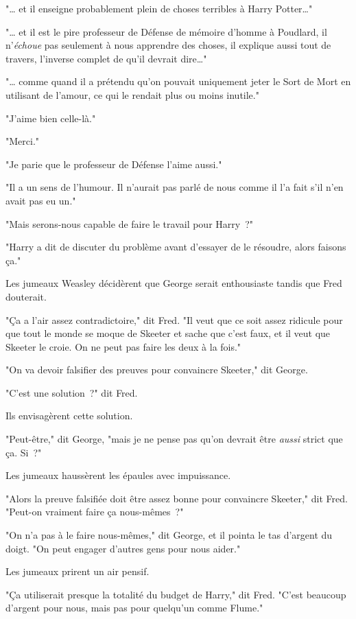 "… et il enseigne probablement plein de choses terribles à Harry Potter…"

"… et il est le pire professeur de Défense de mémoire d'homme à Poudlard, il n'\emph{échoue} pas seulement à nous apprendre des choses, il explique aussi tout de travers, l'inverse complet de qu'il devrait dire…"

"… comme quand il a prétendu qu'on pouvait uniquement jeter le Sort de Mort en utilisant de l'amour, ce qui le rendait plus ou moins inutile."

"J'aime bien celle-là."

"Merci."

"Je parie que le professeur de Défense l'aime aussi."

"Il a un sens de l'humour. Il n'aurait pas parlé de nous comme il l'a fait s'il n'en avait pas eu un."

"Mais serons-nous capable de faire le travail pour Harry~?"

"Harry a dit de discuter du problème avant d'essayer de le résoudre, alors faisons ça."

Les jumeaux Weasley décidèrent que George serait enthousiaste tandis que Fred douterait.

"Ça a l'air assez contradictoire," dit Fred. "Il veut que ce soit assez ridicule pour que tout le monde se moque de Skeeter et sache que c'est faux, et il veut que Skeeter le croie. On ne peut pas faire les deux à la fois."

"On va devoir falsifier des preuves pour convaincre Skeeter," dit George.

"C'est une solution~?" dit Fred.

Ils envisagèrent cette solution.

"Peut-être," dit George, "mais je ne pense pas qu'on devrait être \emph{aussi} strict que ça. Si~?"

Les jumeaux haussèrent les épaules avec impuissance.

"Alors la preuve falsifiée doit être assez bonne pour convaincre Skeeter," dit Fred. "Peut-on vraiment faire ça nous-mêmes~?"

"On n'a pas à le faire nous-mêmes," dit George, et il pointa le tas d'argent du doigt. "On peut engager d'autres gens pour nous aider."

Les jumeaux prirent un air pensif.

"Ça utiliserait presque la totalité du budget de Harry," dit Fred. "C'est beaucoup d'argent pour nous, mais pas pour quelqu'un comme Flume."

